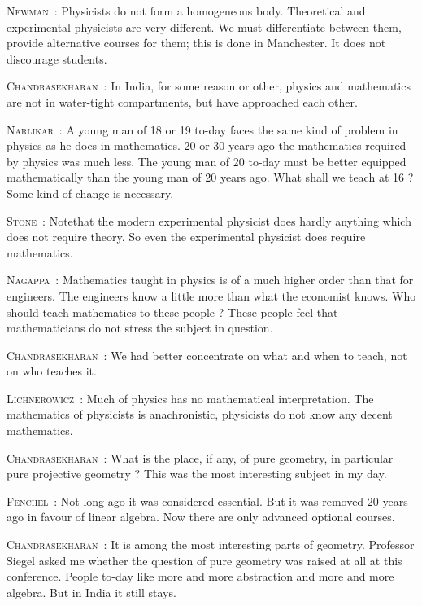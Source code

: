 \smallskip
\noindent
\textsc{Newman}~: Physicists do not form a homogeneous body. Theoretical and experimental physicists are very different. We must differentiate between them, provide alternative courses for them; this is done in Manchester. It does not discourage students.

\smallskip
\noindent
\textsc{Chandrasekharan}~: In India, for some reason or other, physics and mathematics are not in water-tight compartments, but have approached each other.

\smallskip
\noindent
\textsc{Narlikar}~: A young man of 18 or 19 to-day faces the same kind of problem in physics as he does in mathematics. 20 or 30 years ago the mathematics required by physics was much less. The young man of 20 to-day must be better equipped mathematically than the young man of 20 years ago. What shall we teach at 16 ? Some kind of change is necessary.

\smallskip
\noindent
\textsc{Stone}~: Note\pageoriginale that the modern experimental physicist does hardly anything which does not require theory. So even the experimental physicist does require mathematics.

\smallskip
\noindent
\textsc{Nagappa}~: Mathematics taught in physics is of a much higher order than that for engineers. The engineers know a little more than what the economist knows. Who should teach mathematics to these people ? These people feel that mathematicians do not stress the subject in question.

\smallskip
\noindent
\textsc{Chandrasekharan}~: We had better concentrate on what and when to teach, not on who teaches it.

\smallskip
\noindent
\textsc{Lichnerowicz}~: Much of physics has no mathematical interpretation. The mathematics of physicists is anachronistic, physicists do not know any decent mathematics.

\smallskip
\noindent
\textsc{Chandrasekharan}~: What is the place, if any, of pure geometry, in particular pure projective geometry ? This was the most interesting subject in my day.

\smallskip
\noindent
\textsc{Fenchel}~: Not long ago it was considered essential. But it was removed 20 years ago in favour of linear algebra. Now there are only advanced optional courses.

\smallskip
\noindent
\textsc{Chandrasekharan}~: It is among the most interesting parts of geometry. Professor Siegel asked me whether the question of pure geometry was raised at all at this conference. People to-day like more and more abstraction and more and more algebra. But in India it still stays.


